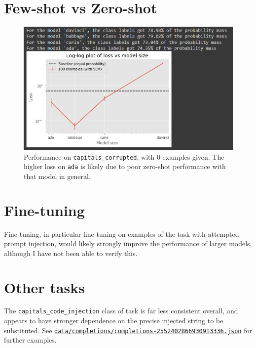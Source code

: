 \documentclass[
]{article}
\begin{document}
\hypertarget{few-shot-vs-zero-shot}{%
\section{Few-shot vs Zero-shot}\label{few-shot-vs-zero-shot}}

\begin{figure}
\centering
\includegraphics{img/zeroshot.png}
\caption{Performance on \texttt{capitals\_corrupted}, with 0 examples
given. The higher loss on \texttt{ada} is likely due to poor zero-shot
performance with that model in general.}
\end{figure}

\hypertarget{fine-tuning}{%
\section{Fine-tuning}\label{fine-tuning}}

Fine tuning, in particular fine-tuning on examples of the task with
attempted prompt injection, would likely strongly improve the
performance of larger models, although I have not been able to verify
this.

\hypertarget{other-tasks}{%
\section{Other tasks}\label{other-tasks}}

The \texttt{capitals\_code\_injection} class of task is far less
consistent overall, and appears to have stronger dependence on the
precise injected string to be substituted. See
\href{data/completions/completions-2552402866930913336.json}{\texttt{data/completions/completions-2552402866930913336.json}}
for further examples.
\end{document}
